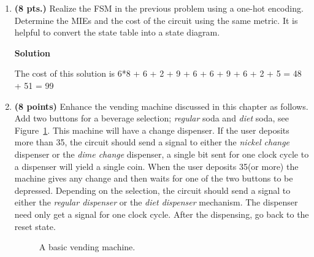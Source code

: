 \begin{enumerate}
    \item \textbf{ (8 pts.)} Realize the FSM in the previous problem using
        a one-hot encoding.  Determine
        the MIEs and the cost of the circuit using the same metric.
        It is helpful to convert the state table into a state diagram.
        \begin{onlysolution}  \textbf{Solution} \itshape{

                The cost of this solution is 6*8 + 6 + 2 + 9 + 6 + 6 + 9 + 6 + 2 + 5 = 48 + 51 = 99
            }
        \end{onlysolution}

    \item \textbf{ (8 points)}
        Enhance the vending machine discussed in this chapter as follows.
        Add two buttons for a beverage selection; \textit{ regular} soda and \textit{ diet}
        soda, see Figure~\ref{fig:Vend}.  This machine will have a change dispenser.
        If the user deposits more than 35\textcent, the circuit should send a signal to
        either the \textit{ nickel change} dispenser or the \textit{ dime change} dispenser,
        a single bit sent for one clock cycle to a dispenser will yield a single coin.
        When the user deposits 35\textcent (or more) the machine gives any change and
        then waits for one of the two buttons to be depressed.  Depending on the
        selection, the circuit should send a signal to either the
        \textit{ regular dispenser} or
        the \textit{ diet dispenser} mechanism.  The dispenser need only get a signal for
        one clock cycle.  After the dispensing, go back to the reset state.
        \begin{figure}[ht]
            \caption{A basic vending machine.}
            \label{fig:Vend}
        \end{figure}


\end{enumerate}
